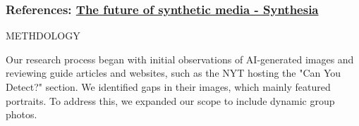     
   

   







\subsubsection{References: \href{https://www.synthesia.io/post/the-future-of-synthetic-media}{The future of synthetic media - Synthesia}}





METHDOLOGY

Our research process began with initial observations of AI-generated images and reviewing guide articles and websites, such as the NYT hosting the "Can You Detect?" section. We identified gaps in their images, which mainly featured portraits. To address this, we expanded our scope to include dynamic group photos.

